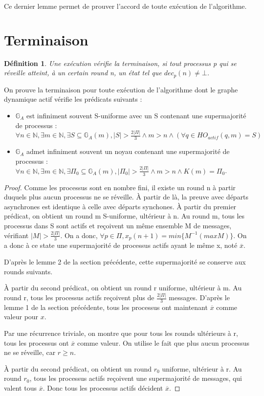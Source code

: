 \documentclass{article}
\newtheorem{definition}{Définition}
\begin{document}
Ce dernier lemme permet de prouver l'accord de toute exécution de l'algorithme.

\section{Terminaison}

\begin{definition}
	Une exécution vérifie la terminaison, si tout processus p qui se réveille atteint, à un certain round n, un état tel que $dec_p(n) \neq \bot$.
\end{definition}

On prouve la terminaison pour toute exécution de l'algorithme dont le graphe dynamique actif vérifie les prédicats suivants :
\begin{itemize}
	\item $\mathds{G}_A$ est infiniment souvent S-uniforme avec un S contenant une supermajorité de processus  :
		$\forall n \in \mathds{N}, \exists m \in \mathds{N}, \exists S \subseteq \mathds{G}_A(m), |S| > \frac{2|\Pi|}{3} \wedge m > n \wedge (\forall q \in HO_{actif}(q, m) = S)$
	\item $\mathds{G}_A$ admet infiniment souvent un noyau contenant une supermajorité de processus :
		$\forall n \in \mathds{N}, \exists m \in \mathds{N}, \exists \Pi_0 \subseteq \mathds{G}_A(m), |\Pi_0| > \frac{2|\Pi|}{3} \wedge m > n \wedge K(m) = \Pi_0$.
\end{itemize}

\begin{proof}

	Comme les processus sont en nombre fini, il existe un round n à partir duquels plus aucun processus ne se réveille.
	À partir de là, la preuve avec départs asynchrones est identique à celle avec départs synchones. 
	À partir du premier prédicat, on obtient un round m S-uniforme, ultérieur à n. Au round m, tous les processus dans S sont actifs et reçoivent un même ensemble M de messages, vérifiant $| M | > \frac{2|\Pi|}{3}$. On a donc, $\forall p \in \Pi, x_p(n+1) = min \{M^{-1} (max M)\}$. On a donc à ce state une supermajorité de processus actifs ayant le même x, noté $\overline{x}$.

D'après le lemme 2 de la section précédente, cette supermajorité se conserve aux rounds suivants.

À partir du second prédicat, on obtient un round r uniforme, ultérieur à m. Au round r, tous les processus actifs reçoivent plus de $\frac{2|\Pi|}{3}$ messages. D'après le lemme 1 de la section précédente, tous les processus ont maintenant $\overline{x}$ comme valeur pour $x$.

	Par une récurrence triviale, on montre que pour tous les rounds ultérieurs à r, tous les processus ont $\overline{x}$ comme valeur.
	On utilise le fait que plus aucun processus ne se réveille, car $r \geq n$.

	À partir du second prédicat, on obtient un round $r_0$ uniforme, ultérieur à r. Au round $r_0$, tous les processus actifs reçoivent une supermajorité de messages, qui valent tous $\overline{x}$. Donc tous les processus actifs décident $\overline{x}$.

\end{proof}
\end{document}
